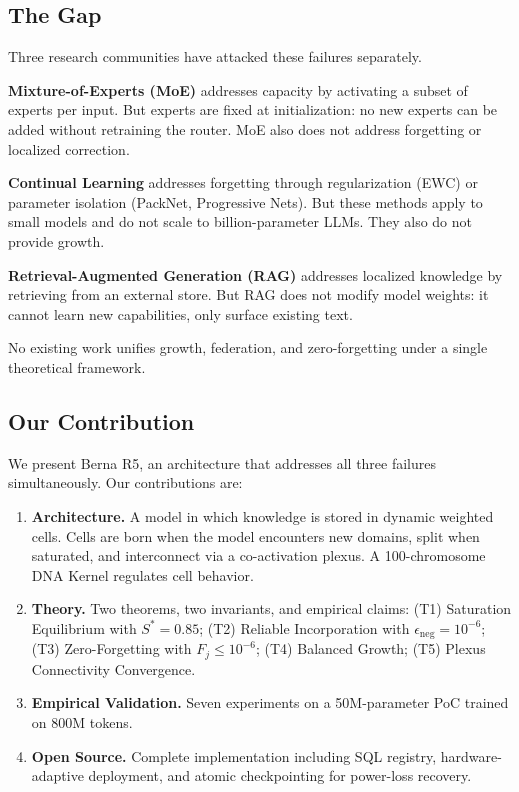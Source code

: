 \documentclass[11pt,a4paper]{article}
\begin{document}
\subsection{The Gap}

Three research communities have attacked these failures
separately.

\textbf{Mixture-of-Experts (MoE)} addresses capacity by
activating a subset of experts per input. But experts are
fixed at initialization: no new experts can be added without
retraining the router. MoE also does not address forgetting
or localized correction.

\textbf{Continual Learning} addresses forgetting through
regularization (EWC) or parameter isolation (PackNet,
Progressive Nets). But these methods apply to small models
and do not scale to billion-parameter LLMs. They also do not
provide growth.

\textbf{Retrieval-Augmented Generation (RAG)} addresses
localized knowledge by retrieving from an external store. But
RAG does not modify model weights: it cannot learn new
capabilities, only surface existing text.

No existing work unifies growth, federation, and
zero-forgetting under a single theoretical framework.

\subsection{Our Contribution}

We present Berna R5, an architecture that addresses all three
failures simultaneously. Our contributions are:

\begin{enumerate}
    \item \textbf{Architecture.} A model in which knowledge is
    stored in dynamic weighted cells. Cells are born when the
    model encounters new domains, split when saturated, and
    interconnect via a co-activation plexus. A
    100-chromosome DNA Kernel regulates cell behavior.

    \item \textbf{Theory.} Two theorems, two invariants, and empirical claims:
    (T1) Saturation Equilibrium with $S^* = 0.85$; (T2) Reliable
    Incorporation with $\epsilon_{\text{neg}} = 10^{-6}$;
    (T3) Zero-Forgetting with $F_j \leq 10^{-6}$; (T4) Balanced
    Growth; (T5) Plexus Connectivity Convergence.

    \item \textbf{Empirical Validation.} Seven experiments on a
    50M-parameter PoC trained on 800M tokens.

    \item \textbf{Open Source.} Complete implementation including
    SQL registry, hardware-adaptive deployment, and atomic
    checkpointing for power-loss recovery.
\end{enumerate}
\end{document}
